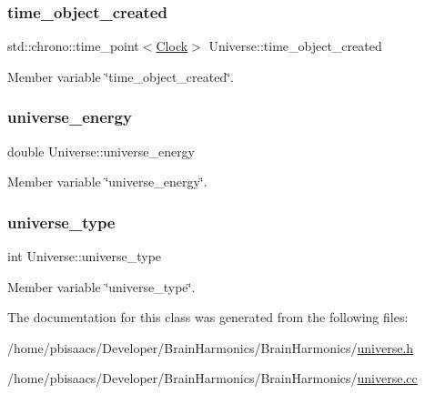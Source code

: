\mbox{\label{classUniverse_a49ef0c3c2bd9ec438f5d9703c6aaa402}} 
\subsubsection{\texorpdfstring{time\+\_\+object\+\_\+created}{time\_object\_created}}
{\footnotesize\ttfamily std\+::chrono\+::time\+\_\+point$<$\mbox{\hyperlink{universe_8h_a0ef8d951d1ca5ab3cfaf7ab4c7a6fd80}{Clock}}$>$ Universe\+::time\+\_\+object\+\_\+created\hspace{0.3cm}{\ttfamily [private]}}



Member variable \char`\"{}time\+\_\+object\+\_\+created\char`\"{}. 

\mbox{\label{classUniverse_a86742eff738f3d7812da8581a59f0812}} 
\subsubsection{\texorpdfstring{universe\+\_\+energy}{universe\_energy}}
{\footnotesize\ttfamily double Universe\+::universe\+\_\+energy\hspace{0.3cm}{\ttfamily [private]}}



Member variable \char`\"{}universe\+\_\+energy\char`\"{}. 

\mbox{\label{classUniverse_a4332e3210a61dcfcb26e16b9f604d489}} 
\subsubsection{\texorpdfstring{universe\+\_\+type}{universe\_type}}
{\footnotesize\ttfamily int Universe\+::universe\+\_\+type\hspace{0.3cm}{\ttfamily [private]}}



Member variable \char`\"{}universe\+\_\+type\char`\"{}. 



The documentation for this class was generated from the following files\+:\begin{DoxyCompactItemize}
\item 
/home/pbisaacs/\+Developer/\+Brain\+Harmonics/\+Brain\+Harmonics/\mbox{\hyperlink{universe_8h}{universe.\+h}}\item 
/home/pbisaacs/\+Developer/\+Brain\+Harmonics/\+Brain\+Harmonics/\mbox{\hyperlink{universe_8cc}{universe.\+cc}}\end{DoxyCompactItemize}
